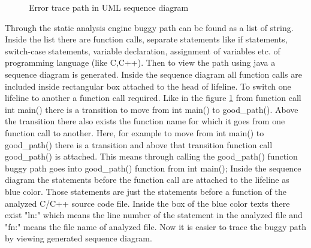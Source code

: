 \begin{figure}[htbp]
	\centering
	\label{Error_trace_path}
	\caption{Error trace path in UML sequence diagram}
\end{figure}

Through the static analysis engine buggy path can be found as a list of string. Inside the list there are function calls, separate statements like if statements, switch-case statements, variable declaration, assignment of variables etc. of programming language (like C,C++). Then to view the path using java a sequence diagram is generated. Inside the sequence diagram all function calls are included inside rectangular box attached to the head of lifeline. To switch one lifeline to another a function call required. Like in the figure \ref{Error_trace_path} from function call int main() there is a transition to move from int main() to good\_path(). Above the transition there also exists the function name for which it goes from one function call to another. Here, for example to move from int main() to good\_path() there is a transition and above that transition function call good\_path() is attached. This means through calling the good\_path() function buggy path goes into good\_path() function from int main(); Inside the sequence diagram the statements before the function call are attached to the lifeline as blue color. Those statements are just the statements before a function of the analyzed C/C++ source code file. Inside the box of the blue color texts there exist "ln:" which means the line number of the statement in the analyzed file and "fn:" means the file name of analyzed file. Now it is easier to trace the buggy path by viewing generated sequence diagram.

